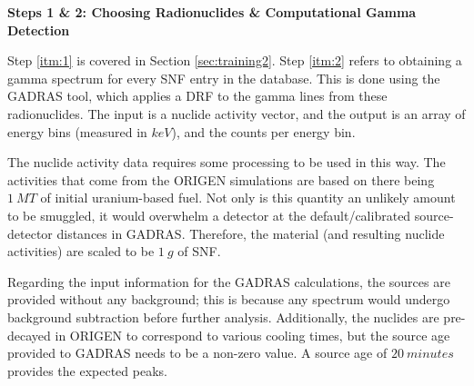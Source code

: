 \noindent \textbf{Steps 1 \& 2: Choosing Radionuclides \& Computational Gamma Detection}

Step \ref{itm:1} is covered in Section \ref{sec:training2}.  Step \ref{itm:2}
refers to obtaining a gamma spectrum for every \gls{SNF} entry in the database.
This is done using the \gls{GADRAS} tool, which applies a \gls{DRF} to the
gamma lines from these radionuclides. The input is a nuclide activity vector,
and the output is an array of energy bins (measured in $keV$), and the counts
per energy bin.

The nuclide activity data requires some processing to be used in this way.  The
activities that come from the \gls{ORIGEN} simulations are based on there being
$1\:MT$ of initial uranium-based fuel. Not only is this quantity an unlikely
amount to be smuggled, it would overwhelm a detector at the default/calibrated
source-detector distances in \gls{GADRAS}.  Therefore, the material (and
resulting nuclide activities) are scaled to be $1\:g$ of \gls{SNF}.

Regarding the input information for the \gls{GADRAS} calculations, the sources
are provided without any background; this is because any spectrum would undergo
background subtraction before further analysis. Additionally, the nuclides are
pre-decayed in \gls{ORIGEN} to correspond to various cooling times, but the
source age provided to \gls{GADRAS} needs to be a non-zero value. A source age
of $20\:minutes$ provides the expected peaks.

